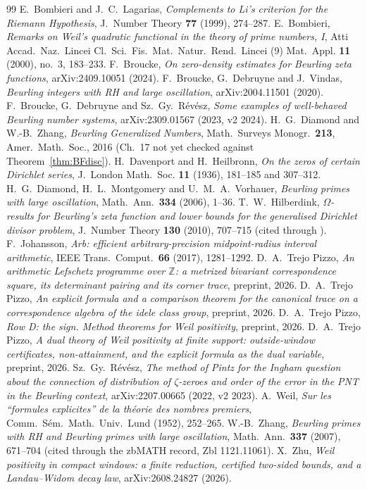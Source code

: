 \documentclass[11pt]{amsart}
\theoremstyle{definition}
\theoremstyle{remark}
\newcommand{\Z}{\mathbb Z}
\begin{document}
\begin{thebibliography}{99}
 E.~Bombieri and J.~C.~Lagarias, \emph{Complements to Li's criterion
for the Riemann Hypothesis}, J.~Number Theory \textbf{77} (1999), 274--287.
 E.~Bombieri, \emph{Remarks on Weil's quadratic functional in the theory of
prime numbers, I}, Atti Accad.~Naz.~Lincei Cl.~Sci.~Fis.~Mat.~Natur.~Rend.~Lincei (9) Mat.~Appl.
\textbf{11} (2000), no.~3, 183--233.
 F.~Broucke, \emph{On zero-density estimates for Beurling zeta functions}, arXiv:2409.10051 (2024).
 F.~Broucke, G.~Debruyne and J.~Vindas, \emph{Beurling integers with RH and large oscillation}, arXiv:2004.11501 (2020).
 F.~Broucke, G.~Debruyne and Sz.~Gy.~R\'ev\'esz, \emph{Some examples of well-behaved Beurling number systems}, arXiv:2309.01567 (2023, v2 2024).
 H.~G.~Diamond and W.-B.~Zhang, \emph{Beurling Generalized Numbers}, Math.\ Surveys Monogr.\ \textbf{213}, Amer.\ Math.\ Soc., 2016 (Ch.~17 not yet checked against Theorem~\ref{thm:BFdisc}).
 H.~Davenport and H.~Heilbronn, \emph{On the zeros of certain
Dirichlet series}, J.~London Math.~Soc. \textbf{11} (1936), 181--185 and 307--312.
 H.~G.~Diamond, H.~L.~Montgomery and U.~M.~A.~Vorhauer, \emph{Beurling primes with
large oscillation}, Math.~Ann.\ \textbf{334} (2006), 1--36.
 T.~W.~Hilberdink, \emph{$\Omega$-results for Beurling's zeta function and lower bounds for the generalised Dirichlet divisor problem}, J.~Number Theory \textbf{130} (2010), 707--715 (cited through \cite{Revesz2023}).
 F.~Johansson, \emph{Arb: efficient arbitrary-precision midpoint-radius interval
arithmetic}, IEEE Trans.\ Comput.\ \textbf{66} (2017), 1281--1292.
 D.~A.~Trejo Pizzo, \emph{An arithmetic Lefschetz programme over $\Z$: a metrized
bivariant correspondence square, its determinant pairing and its corner trace}, preprint, 2026.
 D.~A.~Trejo Pizzo, \emph{An explicit formula and a comparison theorem for the canonical trace on a correspondence
algebra of the idele class group}, preprint, 2026.
 D.~A.~Trejo Pizzo, \emph{Row D: the sign. Method theorems for Weil positivity}, preprint, 2026.
 D.~A.~Trejo Pizzo, \emph{A dual theory of Weil positivity at finite support:
outside-window certificates, non-attainment, and the explicit formula as the dual variable}, preprint, 2026.
 Sz.~Gy.~R\'ev\'esz, \emph{The method of Pintz for the Ingham question about the connection of distribution of $\zeta$-zeroes and order of the error in the PNT in the Beurling context}, arXiv:2207.00665 (2022, v2 2023).
 A.~Weil, \emph{Sur les ``formules explicites'' de la th\'eorie des nombres
premiers}, Comm.~S\'em.~Math.~Univ.~Lund (1952), 252--265.
 W.-B.~Zhang, \emph{Beurling primes with RH and Beurling primes with large oscillation}, Math.~Ann.\ \textbf{337} (2007), 671--704 (cited through the zbMATH record, Zbl 1121.11061).
 X.~Zhu, \emph{Weil positivity in compact windows: a finite reduction, certified
two-sided bounds, and a Landau--Widom decay law}, arXiv:2608.24827 (2026).
\end{thebibliography}
\end{document}
